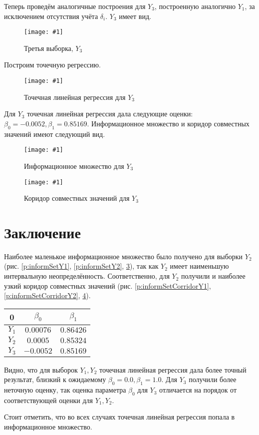 \documentclass[a4paper,12pt]{article}
\newcommand{\plot}[3]{
    \begin{figure}[H]
        \begin{center}
            \texttt{[image: \#1]}
            \caption{#2}
            \label{#3}
        \end{center}
    \end{figure}
}
\begin{document}
    Теперь проведём аналогичные построения для $ Y_3 $, построенную аналогично $ Y_1 $,
    за исключением отсутствия учёта $ \delta_i $.
    $ Y_3 $ имеет вид.
    \plot{Y3}{Третья выборка, $ Y_3 $}{p:sampleY3}

    Построим точечную регрессию.
    \plot{PointRegressionY3}{Точечная линейная регрессия для $ Y_3 $}{p:regressionY3}

    Для $ Y_3 $ точечная линейная регрессия дала следующие оценки: $ \beta_0 = -0.0052, \beta_1 = 0.85169 $.
    Информационное множество и коридор совместных значений имеют следующий вид.

    \plot{InformSetY3}{Информационное множество для $ Y_3 $}{p:informSetY3}
    \plot{informSetCorridorY3}{Коридор совместных значений для $ Y_3 $}{p:informSetCorridorY3}

    \section{Заключение}
    \quad Наиболее маленькое информационное множество было получено для выборки $ Y_2 $
    (рис. \ref{p:informSetY1}, \ref{p:informSetY2}, \ref{p:informSetY3}), так как $ Y_2 $ имеет наименьшую интервальную неопределённость.
    Соответственно, для $ Y_2 $ получили и наиболее узкий коридор совместных значений
    (рис. \ref{p:informSetCorridorY1}, \ref{p:informSetCorridorY2}, \ref{p:informSetCorridorY3}).

    \begin{table}[H]
        \begin{tabular}{| c | c | c |}
            \hline
            0 & $ \beta_0 $ & $ \beta_1 $ \\
            \hline
            $ Y_1 $ & $ 0.00076 $ & $ 0.86426 $ \\
            \hline
            $ Y_2 $ & $ 0.0005 $ & $ 0.85324 $ \\
            \hline
            $ Y_3 $ & $ -0.0052 $ & $ 0.85169 $ \\
            \hline
        \end{tabular}
        \centering
    \end{table}

    Видно, что для выборок $ Y_1, Y_2 $ точечная линейная регрессия дала более точный результат,
    близкий к ожидаемому $ \beta_0 = 0.0, \beta_1 = 1.0 $. Для $ Y_3 $ получили более неточную оценку,
    так оценка параметра $ \beta_0 $ для $ Y_3 $ отличается на порядок от соответствующей оценки для $ Y_1, Y_2 $.

    Стоит отметить, что во всех случаях точечная линейная регрессия попала в информационное множество.
\end{document}
